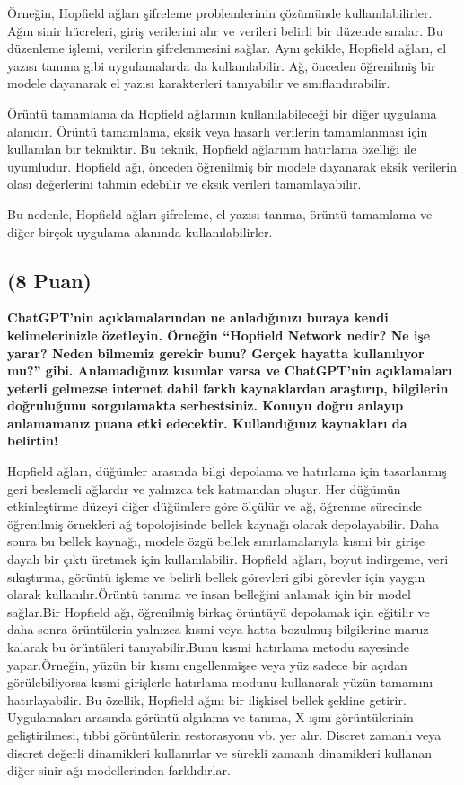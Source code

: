 \documentclass[11pt]{article}
\begin{document}
Örneğin, Hopfield ağları şifreleme problemlerinin çözümünde kullanılabilirler. Ağın sinir hücreleri, giriş verilerini alır ve verileri belirli bir düzende sıralar. Bu düzenleme işlemi, verilerin şifrelenmesini sağlar. Aynı şekilde, Hopfield ağları, el yazısı tanıma gibi uygulamalarda da kullanılabilir. Ağ, önceden öğrenilmiş bir modele dayanarak el yazısı karakterleri tanıyabilir ve sınıflandırabilir.

Örüntü tamamlama da Hopfield ağlarının kullanılabileceği bir diğer uygulama alanıdır. Örüntü tamamlama, eksik veya hasarlı verilerin tamamlanması için kullanılan bir tekniktir. Bu teknik, Hopfield ağlarının hatırlama özelliği ile uyumludur. Hopfield ağı, önceden öğrenilmiş bir modele dayanarak eksik verilerin olası değerlerini tahmin edebilir ve eksik verileri tamamlayabilir.

Bu nedenle, Hopfield ağları şifreleme, el yazısı tanıma, örüntü tamamlama ve diğer birçok uygulama alanında kullanılabilirler.


\subsection{(8 Puan)} \textbf{ChatGPT’nin açıklamalarından ne anladığınızı buraya kendi kelimelerinizle özetleyin. Örneğin ``Hopfield Network nedir? Ne işe yarar? Neden bilmemiz gerekir bunu? Gerçek hayatta kullanılıyor mu?'' gibi. Anlamadığınız kısımlar varsa ve ChatGPT’nin açıklamaları yeterli gelmezse internet dahil farklı kaynaklardan araştırıp, bilgilerin doğruluğunu sorgulamakta serbestsiniz. Konuyu doğru anlayıp anlamamanız puana etki edecektir. Kullandığınız kaynakları da belirtin!}

Hopfield ağları, düğümler arasında bilgi depolama ve hatırlama için tasarlanmış geri beslemeli ağlardır ve yalnızca tek katmandan oluşur. Her düğümün etkinleştirme düzeyi diğer düğümlere göre ölçülür ve ağ, öğrenme sürecinde öğrenilmiş örnekleri ağ topolojisinde bellek kaynağı olarak depolayabilir. Daha sonra bu bellek kaynağı, modele özgü bellek sınırlamalarıyla kısmi bir girişe dayalı bir çıktı üretmek için kullanılabilir. Hopfield ağları, boyut indirgeme, veri sıkıştırma, görüntü işleme ve belirli bellek görevleri gibi görevler için yaygın olarak kullanılır.Örüntü tanıma ve insan belleğini anlamak için bir model sağlar.Bir Hopfield ağı, öğrenilmiş birkaç örüntüyü depolamak için eğitilir ve daha sonra örüntülerin yalnızca kısmi veya hatta bozulmuş bilgilerine maruz kalarak bu örüntüleri tanıyabilir.Bunu kısmi hatırlama metodu sayesinde yapar.Örneğin, yüzün bir kısmı engellenmişse veya yüz sadece bir açıdan görülebiliyorsa kısmi girişlerle hatırlama modunu kullanarak yüzün tamamını hatırlayabilir. Bu özellik, Hopfield ağını bir ilişkisel bellek şekline getirir. Uygulamaları arasında görüntü algılama ve tanıma, X-ışını görüntülerinin geliştirilmesi, tıbbi görüntülerin restorasyonu vb. yer alır. Discret zamanlı veya discret değerli dinamikleri kullanırlar ve sürekli zamanlı dinamikleri kullanan diğer sinir ağı modellerinden farklıdırlar.
\end{document}

